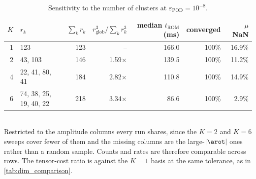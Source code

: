 \begin{table}[tb]
  \centering
  \caption{Sensitivity to the number of clusters at $\varepsilon_{\mathrm{POD}} = 10^{-8}$.}
  \label{tab:k_sensitivity}
  \begin{tabular}{rlrrrrr}
    \toprule
    $K$ & $r_k$ & $\sum_k r_k$ & $r_{\mathrm{glob}}^3/\sum_k r_k^3$ & median $t_{\mathrm{ROM}}$ (ms) & converged & $\mu$ NaN \\
    \midrule
    1 & 123 & 123 & -- & 166.0 & 100\% & 16.9\% \\
    2 & 43, 103 & 146 & 1.59$\times$ & 139.5 & 100\% & 11.2\% \\
    4 & 22, 41, 80, 41 & 184 & 2.82$\times$ & 110.8 & 100\% & 14.9\% \\
    6 & 74, 38, 25, 19, 40, 22 & 218 & 3.34$\times$ & 86.6 & 100\% & 2.9\% \\
    \bottomrule
  \end{tabular}
  \\[2pt] \footnotesize Restricted to the amplitude columns every run shares, since the $K = 2$ and $K = 6$ sweeps cover fewer of them and the missing columns are the large-$|\arot|$ ones rather than a random sample. Counts and rates are therefore comparable across rows. The tensor-cost ratio is against the $K = 1$ basis at the same tolerance, as in \cref{tab:dim_comparison}.
\end{table}
